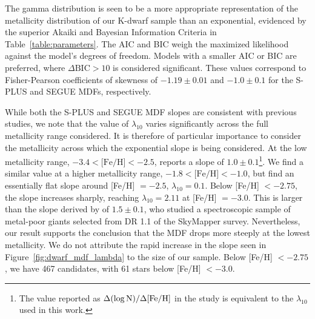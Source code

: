 \documentclass[twocolumn,trackchanges]{aastex63}
\begin{document}
The gamma distribution is seen to be a more appropriate representation of the metallicity distribution of our K-dwarf sample than an exponential, evidenced by the superior Akaiki and Bayesian Information Criteria in Table~\ref{table:parameters}. The AIC and BIC weigh the maximized likelihood against the model's degrees of freedom. Models with a smaller AIC or BIC are preferred, where $\Delta \textrm{BIC} > 10$ is considered significant. These values correspond to Fisher-Pearson coefficients of skewness of $-1.19 \pm 0.01$ and $-1.0 \pm 0.1$ for the S-PLUS and SEGUE MDFs, respectively. 

While both the S-PLUS and SEGUE MDF slopes are consistent with previous studies, we note that the value of $\lambda_{10}$ varies significantly across the full metallicity range considered. It is therefore of particular importance to consider the metallicity across which the exponential slope is being considered. At the low metallicity range, $-3.4 < \textrm{[Fe/H]} < -2.5$, \citet{Youakim:2020} reports a slope of $1.0 \pm 0.1$\footnote{The value reported as $\Delta(\log{\rm N})/\Delta\textrm{[Fe/H]}$ in the \citet{Youakim:2020} study is equivalent to the $\lambda_{10}$ used in this work.}. We find a similar value at a higher metallicity range, $-1.8 < \textrm{[Fe/H]} < -1.0$, but find an essentially flat slope around [Fe/H] $=-2.5$, $\lambda_{10} = 0.1$. Below [Fe/H]  $<-2.75$, the slope increases sharply, reaching $\lambda_{10} = 2.11$ at [Fe/H]  $=-3.0$. This is larger than the slope derived by \citet{DaCosta:2019} of $1.5 \pm 0.1$, who studied a spectroscopic sample of metal-poor giants selected from DR 1.1 of the SkyMapper survey. Nevertheless, our result supports the conclusion that the MDF drops more steeply at the lowest metallicity. We do not attribute the rapid increase in the slope seen in Figure~\ref{fig:dwarf_mdf_lambda} to the size of our sample. Below [Fe/H] $<-2.75$, we have 467 candidates, with 61 stars below [Fe/H] $<-3.0$. 
\end{document}
